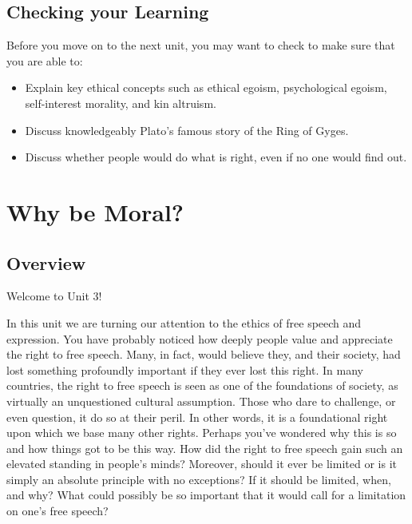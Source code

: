 \documentclass[
]{book}
\providecommand{\tightlist}{%
  \setlength{\itemsep}{0pt}\setlength{\parskip}{0pt}}
\begin{document}
\hypertarget{checking-your-learning-1}{%
\section*{Checking your Learning}\label{checking-your-learning-1}}

\begin{progress}
Before you move on to the next unit, you may want to check to make sure that you are able to:

\begin{itemize}
\tightlist
\item
  Explain key ethical concepts such as ethical egoism, psychological egoism, self-interest morality, and kin altruism.
\item
  Discuss knowledgeably Plato's famous story of the Ring of Gyges.
\item
  Discuss whether people would do what is right, even if no one would find out.
\end{itemize}
\end{progress}

\hypertarget{why-be-moral-1}{%
\chapter{Why be Moral?}\label{why-be-moral-1}}

\hypertarget{overview-2}{%
\section*{Overview}\label{overview-2}}

Welcome to Unit 3!

In this unit we are turning our attention to the ethics of free speech and expression. You have probably noticed how deeply people value and appreciate the right to free speech. Many, in fact, would believe they, and their society, had lost something profoundly important if they ever lost this right. In many countries, the right to free speech is seen as one of the foundations of society, as virtually an unquestioned cultural assumption. Those who dare to challenge, or even question, it do so at their peril. In other words, it is a foundational right upon which we base many other rights. Perhaps you've wondered why this is so and how things got to be this way. How did the right to free speech gain such an elevated standing in people's minds? Moreover, should it ever be limited or is it simply an absolute principle with no exceptions? If it should be limited, when, and why? What could possibly be so important that it would call for a limitation on one's free speech?
\end{document}
